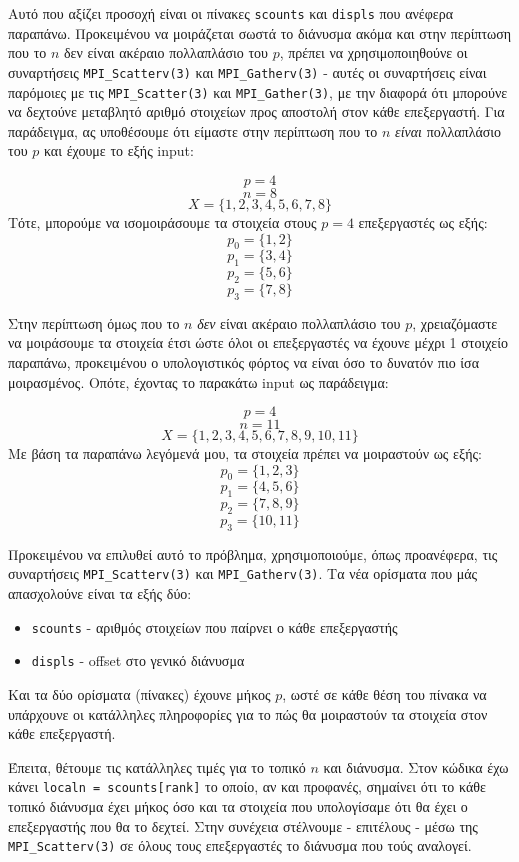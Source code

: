 \documentclass{article}
\begin{document}
Αυτό που αξίζει προσοχή είναι οι πίνακες \lstinline{scounts} και
\lstinline{displs} που ανέφερα παραπάνω. Προκειμένου να μοιράζεται σωστά το
διάνυσμα ακόμα και στην περίπτωση που το $n$ δεν είναι ακέραιο πολλαπλάσιο του
$p$, πρέπει να χρησιμοποιηθούνε οι συναρτήσεις \lstinline{MPI_Scatterv(3)} και
\lstinline{MPI_Gatherv(3)} - αυτές οι συναρτήσεις είναι παρόμοιες με τις
\lstinline{MPI_Scatter(3)} και \lstinline{MPI_Gather(3)}, με την διαφορά ότι
μπορούνε να δεχτούνε μεταβλητό αριθμό στοιχείων προς αποστολή στον κάθε επεξεργαστή.
Για παράδειγμα, ας υποθέσουμε ότι είμαστε στην περίπτωση που το $n$ \textit{είναι}
πολλαπλάσιο του $p$ και έχουμε το εξής input:

\[p = 4\]
\[n = 8 \]
\[X = \{1, 2, 3, 4, 5, 6, 7, 8\}\]
Τότε, μπορούμε να ισομοιράσουμε τα στοιχεία στους $p = 4$ επεξεργαστές ως εξής:
\[p_0 = \{1, 2\}\]
\[p_1 = \{3, 4\}\]
\[p_2 = \{5, 6\}\]
\[p_3 = \{7, 8\}\]

Στην περίπτωση όμως που το $n$ \textit{δεν} είναι ακέραιο πολλαπλάσιο του $p$,
χρειαζόμαστε να μοιράσουμε τα στοιχεία έτσι ώστε όλοι οι επεξεργαστές να έχουνε
μέχρι 1 στοιχείο παραπάνω, προκειμένου ο υπολογιστικός φόρτος να είναι όσο το
δυνατόν πιο ίσα μοιρασμένος. Οπότε, έχοντας το παρακάτω input ως παράδειγμα:

\[p = 4\]
\[n = 11 \]
\[X = \{1, 2, 3, 4, 5, 6, 7, 8, 9, 10, 11\}\]
Με βάση τα παραπάνω λεγόμενά μου, τα στοιχεία πρέπει να μοιραστούν ως εξής:
\[p_0 = \{1, 2, 3\}\]
\[p_1 = \{4, 5, 6\}\]
\[p_2 = \{7, 8, 9\}\]
\[p_3 = \{10, 11\}\]

Προκειμένου να επιλυθεί αυτό το πρόβλημα, χρησιμοποιούμε, όπως προανέφερα,
τις συναρτήσεις \lstinline{MPI_Scatterv(3)} και \lstinline{MPI_Gatherv(3)}.
Τα νέα ορίσματα που μάς απασχολούνε είναι τα εξής δύο:

\begin{itemize}
        \item \lstinline{scounts} - αριθμός στοιχείων που παίρνει ο κάθε επεξεργαστής
        \item \lstinline{displs} - offset στο γενικό διάνυσμα
\end{itemize}

Και τα δύο ορίσματα (πίνακες) έχουνε μήκος $p$, ωστέ σε κάθε
θέση του πίνακα να υπάρχουνε οι κατάλληλες πληροφορίες για το πώς θα μοιραστούν
τα στοιχεία στον κάθε επεξεργαστή.

Έπειτα, θέτουμε τις κατάλληλες τιμές για το τοπικό $n$ και διάνυσμα. Στον κώδικα
έχω κάνει \lstinline{localn = scounts[rank]} το οποίο, αν και προφανές, σημαίνει
ότι το κάθε τοπικό διάνυσμα έχει μήκος όσο και τα στοιχεία που υπολογίσαμε ότι
θα έχει ο επεξεργαστής που θα το δεχτεί. Στην συνέχεια στέλνουμε - επιτέλους -
μέσω της \lstinline{MPI_Scatterv(3)} σε όλους τους επεξεργαστές το διάνυσμα που
τούς αναλογεί.
\end{document}
